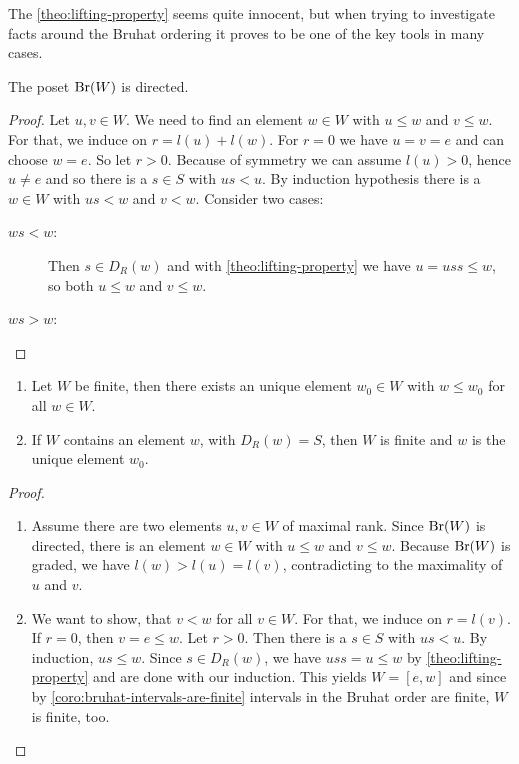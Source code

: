 The \ref{theo:lifting-property} seems quite innocent, but when trying to investigate facts around the Bruhat ordering it proves to be one of the key tools in many cases.

\begin{prop}
	The poset $\operatorname{Br}(W)$ is directed.

	\begin{proof}
		Let $u,v \in W$. We need to find an element $w \in W$ with $u \leq w$ and $v \leq w$. For that, we induce on $r = l(u) + l(w)$. For $r = 0$ we have $u = v = e$ and can choose $w = e$. So let $r > 0$. Because of symmetry we can assume $l(u) > 0$, hence $u \neq e$ and so there is a $s \in S$ with $us < u$. By induction hypothesis there is a $w \in W$ with $us < w$ and  $v < w$. Consider two cases:

		\begin{description}
			\item[$ws < w$:] Then $s \in D_R(w)$ and with \ref{theo:lifting-property} we have $u = uss \leq w$, so both $u \leq w$ and $v \leq w$.
			\item[$ws > w$:] \todo \qedhere
		\end{description}
	\end{proof}
\end{prop}

\begin{coro}
	\begin{enumerate}
		\item Let $W$ be finite, then there exists an unique element $w_0 \in W$ with $w \leq w_0$ for all $w \in W$.
		\item If $W$ contains an element $w$, with $D_R(w) = S$, then $W$ is finite and $w$ is the unique element $w_0$.
	\end{enumerate}

	\begin{proof}
		\begin{enumerate}
			\item Assume there are two elements $u,v \in W $ of maximal rank. Since $\operatorname{Br}(W)$ is directed, there is an element $w \in W$ with $u \leq w$ and $v \leq w$. Because $\operatorname{Br}(W)$ is graded, we have $l(w) > l(u) = l(v)$, contradicting to the maximality of $u$ and $v$.
			\item We want to show, that $v < w$ for all $v \in W$. For that, we induce on $r = l(v)$. If $r = 0$, then $v = e \leq w$. Let $r > 0$. Then there is a $s \in S$ with $us < u$. By induction, $us \leq w$. Since $s \in D_R(w)$, we have $uss = u \leq w$ by \ref{theo:lifting-property} and are done with our induction. This yields $W = [e,w]$ and since by \ref{coro:bruhat-intervals-are-finite} intervals in the Bruhat order are finite, $W$ is finite, too. \qedhere
		\end{enumerate}
	\end{proof}
\end{coro}